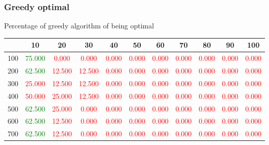 \documentclass[12]{beamer}
\begin{document}
\begin{frame}
\frametitle{Greedy optimal }

Percentage of greedy algorithm of being optimal
\begin{center}
\begin{adjustbox}{max width=\textwidth}
\small
\begin{tabular}{ |c|c|c|c|c|c|c|c|c|c|c|}
\hline
  & 10 & 20 & 30 & 40 & 50 & 60 & 70 & 80 & 90 & 100 \\ 
\hline
 100 &\textcolor{green}{75.000} &\textcolor{red}{0.000} &\textcolor{red}{0.000} &\textcolor{red}{0.000} &\textcolor{red}{0.000} &\textcolor{red}{0.000} &\textcolor{red}{0.000} &\textcolor{red}{0.000} &\textcolor{red}{0.000} &\textcolor{red}{0.000} \\ 
\hline
 200 &\textcolor{green}{62.500} &\textcolor{red}{12.500} &\textcolor{red}{12.500} &\textcolor{red}{0.000} &\textcolor{red}{0.000} &\textcolor{red}{0.000} &\textcolor{red}{0.000} &\textcolor{red}{0.000} &\textcolor{red}{0.000} &\textcolor{red}{0.000} \\ 
\hline
 300 &\textcolor{red}{25.000} &\textcolor{red}{12.500} &\textcolor{red}{12.500} &\textcolor{red}{0.000} &\textcolor{red}{0.000} &\textcolor{red}{0.000} &\textcolor{red}{0.000} &\textcolor{red}{0.000} &\textcolor{red}{0.000} &\textcolor{red}{0.000} \\ 
\hline
 400 &\textcolor{red}{50.000} &\textcolor{red}{25.000} &\textcolor{red}{12.500} &\textcolor{red}{0.000} &\textcolor{red}{0.000} &\textcolor{red}{0.000} &\textcolor{red}{0.000} &\textcolor{red}{0.000} &\textcolor{red}{0.000} &\textcolor{red}{0.000} \\ 
\hline
 500 &\textcolor{green}{62.500} &\textcolor{red}{25.000} &\textcolor{red}{0.000} &\textcolor{red}{0.000} &\textcolor{red}{0.000} &\textcolor{red}{0.000} &\textcolor{red}{0.000} &\textcolor{red}{0.000} &\textcolor{red}{0.000} &\textcolor{red}{0.000} \\ 
\hline
 600 &\textcolor{green}{62.500} &\textcolor{red}{12.500} &\textcolor{red}{0.000} &\textcolor{red}{0.000} &\textcolor{red}{0.000} &\textcolor{red}{0.000} &\textcolor{red}{0.000} &\textcolor{red}{0.000} &\textcolor{red}{0.000} &\textcolor{red}{0.000} \\ 
\hline
 700 &\textcolor{green}{62.500} &\textcolor{red}{12.500} &\textcolor{red}{0.000} &\textcolor{red}{0.000} &\textcolor{red}{0.000} &\textcolor{red}{0.000} &\textcolor{red}{0.000} &\textcolor{red}{0.000} &\textcolor{red}{0.000} &\textcolor{red}{0.000} \\ 
\hline

\end{tabular}
\end{adjustbox}
\end{center}
\end{frame}
\end{document}
